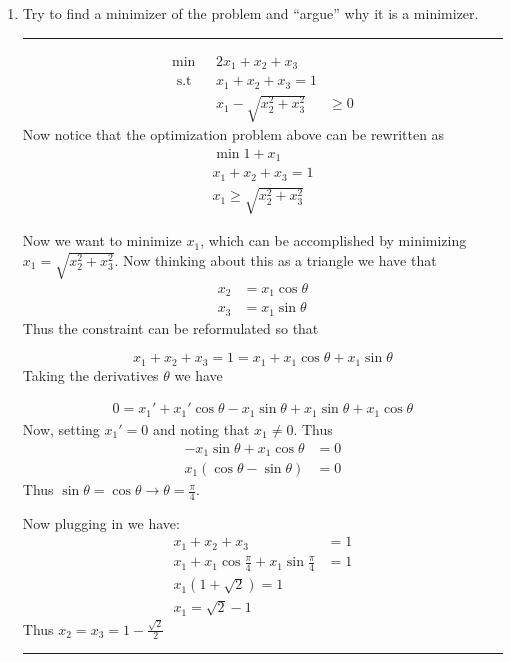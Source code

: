 \documentclass{article} %
\begin{document}
\begin{enumerate}
\rule{\textwidth}{1pt}
\item  Try to find a minimizer of the problem and “argue” why it is a minimizer.
\rule{\textwidth}{1pt}
\begin{equation*}
\begin{aligned}
\min \mbox{ } & 2 x_1 + x_2 + x_3 \\ 
\mbox{ s.t } &  x_1 + x_2 + x_3 = 1 \\ 
 & x_1 - \sqrt{x_2^2 + x_3^2} & \geq 0
\end{aligned}
\end{equation*}
Now notice that the optimization problem above can be rewritten as 
\begin{equation*}
\begin{aligned}
\min 1 + x_1 \\ 
x_1 + x_2 + x_3 = 1 \\ 
x_1 \geq \sqrt{x_2^2 + x_3^2} 
\end{aligned}
\end{equation*}

Now we want to minimize $x_1$, which can be accomplished by minimizing $x_1 = \sqrt{x_2^2 + x_3^2}$. Now thinking about this as a triangle we have
that 
\begin{equation*}
\begin{aligned}
x_2 &= x_1 \cos{\theta} \\ 
x_3 &= x_1 \sin{\theta}
\end{aligned}
\end{equation*}
Thus the constraint can be reformulated so that 

\[
x_1 + x_2 + x_3 = 1 = x_1 + x_1 \cos{\theta} + x_1 \sin{\theta}
\]
Taking the derivatives $\theta$ we have

\begin{gather*}
0 = x_1' + x_1' \cos{\theta} - x_1 \sin{\theta} + x_1 \sin{\theta} + x_1 \cos{\theta}
\end{gather*}
Now, setting $x_1' = 0$ and noting that $x_1 \neq 0$. Thus 
\begin{equation*}
\begin{aligned}
 -x_1 \sin{\theta} + x_1 \cos{\theta}  &= 0\\
 x_1 (\cos{\theta} - \sin{\theta}) &=  0
\end{aligned}
\end{equation*}
Thus $\sin{\theta} = \cos{\theta} \rightarrow \theta = \frac{\pi}{4}$. 

Now plugging in we have:
\begin{equation*}
\begin{aligned}
x_1 + x_2 + x_3 &= 1\\ 
x_1 + x_1 \cos{\frac{\pi}{4}} + x_1 \sin{\frac{\pi}{4}} &= 1 \\ 
x_1( 1+ \sqrt{2}) = 1 \\ 
x_1 = \sqrt{2} - 1
\end{aligned}
\end{equation*}
Thus $x_2 = x_3 = 1 - \frac{\sqrt{2}}{2}$

\rule{\textwidth}{1pt}
\end{enumerate}
\end{document}
